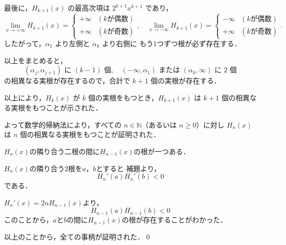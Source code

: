 \begin{tproof}
\begin{enumerate}[(I)]
          最後に，$H_{k+1}(x)$ の最高次項は $2^{k+1} x^{k+1}$ であり，
          \[
            \lim_{x \to +\infty} H_{k+1}(x) =
            \begin{cases}
              +\infty & (k \text{が偶数}) \\
              +\infty & (k \text{が奇数})
            \end{cases},
            \quad
            \lim_{x \to -\infty} H_{k+1}(x) =
            \begin{cases}
              -\infty & (k \text{が偶数}) \\
              +\infty & (k \text{が奇数})
            \end{cases}.
          \]
          したがって，$\alpha_1$ より左側と $\alpha_k$ より右側に
          もう1つずつ根が必ず存在する．

          以上をまとめると，
          \[
            (\alpha_j,\alpha_{j+1}) \text{ に } (k-1)\text{ 個}, \quad
            (-\infty,\alpha_1) \text{ または } (\alpha_k,\infty) \text{ に } 2\text{ 個}
          \]
          の相異なる実根が存在するので，合計で $k+1$ 個の実根が存在する．

          以上により，$H_k(x)$ が $k$ 個の実根をもつとき，$H_{k+1}(x)$ は
          $k+1$ 個の相異なる実根をもつことが示された．
  \end{enumerate}
  よって数学的帰納法により，すべての $n \in \mathbb{N}$（あるいは $n \ge 0$）に対し
  $H_n(x)$ は $n$ 個の相異なる実根をもつことが証明された．
\end{tproof}

\begin{proposition}{}{}
  $H_n(x)$の隣り合う二根の間に$H_{n-1}(x)$の根が一つある．
\end{proposition}


\begin{tproof}
  $H_n(x)$の隣り合う$2$根を$a$，$b$とすると
  補題より，
  \[
    H_n '(a) H_n '(b)<0
  \]
  である．

  $ H_n '(x)=2n H_{n-1}(x)$より，
  \[
    H_{n-1}(a) H_{n-1}(b) < 0
  \]
  このことから，$a$と$b$の間に$H_{n-1}(x)$の根が存在することがわかった．
\end{tproof}
以上のことから，全ての事柄が証明された．\qed



